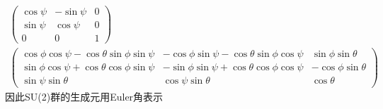 {{{{\begin{displaymath}
\begin{aligned}
			\begin{pmatrix}
				\cos\psi &-\sin\psi &0\\
				\sin\psi &\cos\psi &0\\
				0 &0 &1
			\end{pmatrix}\\
			\begin{pmatrix}
				\cos\phi\cos\psi-\cos\theta\sin\phi\sin\psi &-\cos\phi\sin\psi-\cos\theta\sin\phi\cos\psi &\sin\phi\sin\theta\\
				\sin\phi\cos\psi+\cos\theta\cos\phi\sin\psi &-\sin\phi\sin\psi+\cos\theta\cos\phi\cos\psi &-\cos\phi\sin\theta\\
				\sin\psi\sin\theta &\cos\psi\sin\theta &\cos\theta
			\end{pmatrix}
		\end{aligned}
	\end{displaymath}
因此\textrm{SU(2)}群的生成元用\textrm{Euler}角表示
}}
}

}
